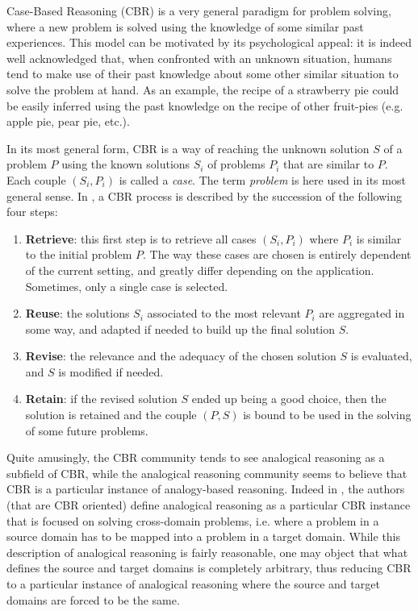 Case-Based Reasoning (CBR) is a very general paradigm for problem solving,
where a new problem is solved using the knowledge of some similar past
experiences. This model can be motivated by its psychological appeal: it is
indeed well acknowledged that, when confronted with an unknown situation,
humans tend to make use of their past knowledge about some other similar
situation to solve the problem at hand. As an example, the recipe of a
strawberry pie could be easily inferred using the past knowledge on the recipe
of other fruit-pies (e.g. apple pie, pear pie, etc.).

In its most general form, CBR is a way of reaching the unknown solution $S$ of a
problem $P$ using the known solutions $S_i$ of problems $P_i$ that are similar
to $P$. Each couple $(S_i, P_i)$ is called a \textit{case}. The term
\textit{problem} is here used in its most general sense.  In \cite{AamPla94}, a
CBR process is described by the succession of the following four steps:
\begin{enumerate}
  \item \textbf{Retrieve}: this first step is to retrieve all cases $(S_i,
    P_i)$ where $P_i$ is similar to the initial problem $P$. The way these
    cases are chosen is entirely dependent of the current setting, and greatly
    differ depending on the application. Sometimes, only a single case  is
    selected.
  \item \textbf{Reuse}: the solutions $S_i$ associated to the most relevant
    $P_i$ are aggregated in some way, and adapted if needed to build up the
    final solution $S$.
  \item \textbf{Revise}: the relevance and the adequacy of the chosen solution
    $S$ is evaluated, and $S$ is modified if needed.
  \item \textbf{Retain}: if the revised solution $S$ ended up being a good
    choice, then the solution is retained and the couple $(P, S)$ is bound to
    be used in the solving of some future problems.
\end{enumerate}

Quite amusingly, the CBR community tends to see analogical reasoning as a
subfield of CBR, while the analogical reasoning community seems to believe that
CBR is a particular instance of analogy-based reasoning. Indeed in
\cite{AamPla94}, the authors (that are CBR oriented) define analogical
reasoning as a particular CBR instance that is focused on solving cross-domain
problems, i.e. where a problem in a source domain has to be mapped into a
problem in a target domain. While this description of analogical reasoning is
fairly reasonable, one may object that what defines the source and target
domains is completely arbitrary, thus reducing CBR to a particular instance of
analogical reasoning where the source and target domains are forced to be the
same.

